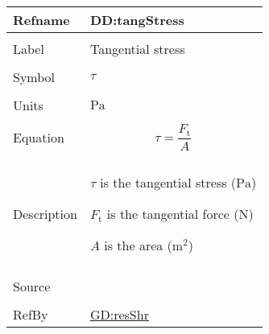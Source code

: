 \documentclass[12pt]{article}
\begin{document}
\vspace{\baselineskip}
\noindent
\begin{minipage}{\textwidth}
\begin{tabular}{>{\raggedright}p{}>{\raggedright\arraybackslash}p{}}
\toprule \textbf{Refname} & \textbf{DD:tangStress}
\label{DD:tangStress}
\\ \midrule \\
Label & Tangential stress
        
\\ \midrule \\
Symbol & $τ$
         
\\ \midrule \\
Units & ${\text{Pa}}$
        
\\ \midrule \\
Equation & \begin{displaymath}
           τ=\frac{{F_{\text{t}}}}{A}
           \end{displaymath}
\\ \midrule \\
Description & \begin{symbDescription}
              \item{$τ$ is the tangential stress (${\text{Pa}}$)}
              \item{${F_{\text{t}}}$ is the tangential force (${\text{N}}$)}
              \item{$A$ is the area (${\text{m}^{2}}$)}
              \end{symbDescription}
\\ \midrule \\
Source & \cite{huston2008}
         
\\ \midrule \\
RefBy & \hyperref[GD:resShr]{GD:resShr}
        
\\ \bottomrule
\end{tabular}
\end{minipage}
\end{document}

